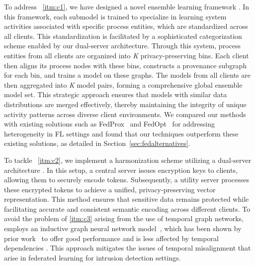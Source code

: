 

To address ~\ref{itm:c1}, we have designed a novel ensemble learning framework . In this framework, each submodel is trained to specialize in learning system activities associated with specific process entities, which are standardized across all clients. This standardization is facilitated by a sophisticated categorization scheme enabled by our dual-server architecture. Through this system, process entities from all clients are organized into \textit{K} privacy-preserving bins. Each client then aligns its process nodes with these bins, constructs a provenance subgraph for each bin, and trains a \gnnshort model on these graphs. The models from all clients are then aggregated into \textit{K} model pairs, forming a comprehensive global ensemble model set. This strategic approach ensures that models with similar data distributions are merged effectively, thereby maintaining the integrity of unique activity patterns across diverse client environments. We compared our methods with existing solutions such as FedProx~\cite{li2020federated} and FedOpt~\cite{asad2020fedopt} for addressing heterogeneity in FL settings and found that our techniques outperform these existing solutions, as detailed in Section~\ref{sec:fedalternatives}.


To tackle ~\ref{itm:c2}, we implement a \wordvec harmonization scheme utilizing a dual-server architecture . In this setup, a central server issues encryption keys to clients, allowing them to securely encode \wordvec tokens. Subsequently, a utility server processes these encrypted tokens to achieve a unified, privacy-preserving vector representation. This method ensures that sensitive data remains protected while facilitating accurate and consistent semantic encoding across different clients. To avoid the problem of \ref{itm:c3} arising from the use of temporal graph networks, \Sys employs an inductive graph neural network model~\cite{hamilton2017inductive}, which has been shown by prior work~\cite{flash2024,shadewatcher,wang2022threatrace} to offer good performance and is less affected by temporal dependencies . This approach mitigates the issues of temporal misalignment that arise in federated learning for intrusion detection settings.

